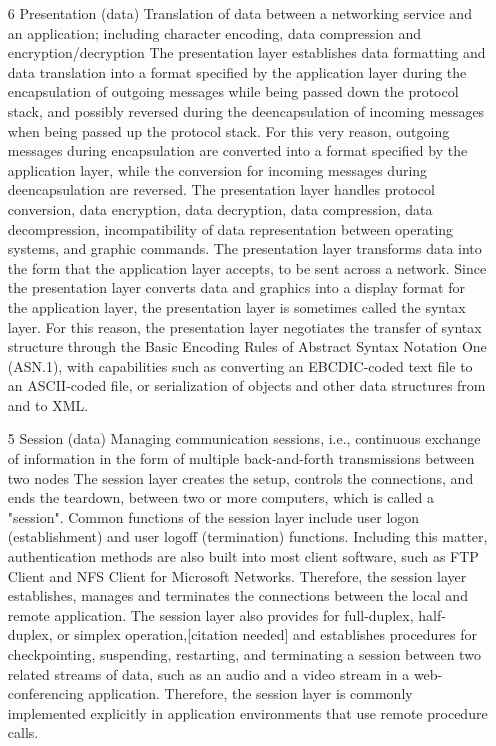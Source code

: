 \documentclass{article}
\begin{document}
\begin{enumerate}[label = \arabic*]
\item[6] Presentation (data) Translation of data between a networking service and an application; including character encoding, data compression and encryption/decryption
	\subitem The presentation layer establishes data formatting and data translation into a format specified by the application layer during the encapsulation of outgoing messages while being passed down the protocol stack, and possibly reversed during the deencapsulation of incoming messages when being passed up the protocol stack. For this very reason, outgoing messages during encapsulation are converted into a format specified by the application layer, while the conversion for incoming messages during deencapsulation are reversed. The presentation layer handles protocol conversion, data encryption, data decryption, data compression, data decompression, incompatibility of data representation between operating systems, and graphic commands. The presentation layer transforms data into the form that the application layer accepts, to be sent across a network. Since the presentation layer converts data and graphics into a display format for the application layer, the presentation layer is sometimes called the syntax layer. For this reason, the presentation layer negotiates the transfer of syntax structure through the Basic Encoding Rules of Abstract Syntax Notation One (ASN.1), with capabilities such as converting an EBCDIC-coded text file to an ASCII-coded file, or serialization of objects and other data structures from and to XML. 

\item[5] Session (data) Managing communication sessions, i.e., continuous exchange of information in the form of multiple back-and-forth transmissions between two nodes 
	\subitem The session layer creates the setup, controls the connections, and ends the teardown, between two or more computers, which is called a "session". Common functions of the session layer include user logon (establishment) and user logoff (termination) functions. Including this matter, authentication methods are also built into most client software, such as FTP Client and NFS Client for Microsoft Networks. Therefore, the session layer establishes, manages and terminates the connections between the local and remote application. The session layer also provides for full-duplex, half-duplex, or simplex operation,[citation needed] and establishes procedures for checkpointing, suspending, restarting, and terminating a session between two related streams of data, such as an audio and a video stream in a web-conferencing application. Therefore, the session layer is commonly implemented explicitly in application environments that use remote procedure calls. 


\end{enumerate}
\end{document}
